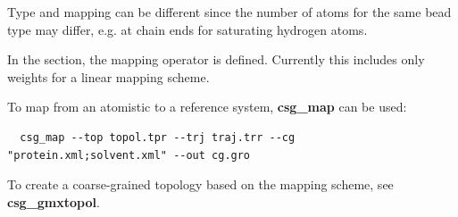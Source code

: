 Type and mapping can be different since the number of atoms for the same bead type may differ, e.g. at chain ends for saturating hydrogen atoms.

In the  section, the mapping operator is defined. Currently this includes only weights for a linear mapping scheme.

To map from an atomistic to a reference system, \textbf{csg\_map} can be used:
\begin{verbatim}
  csg_map --top topol.tpr --trj traj.trr --cg "protein.xml;solvent.xml" --out cg.gro
\end{verbatim}

To create a coarse-grained topology based on the mapping scheme, see \textbf{csg\_gmxtopol}.
